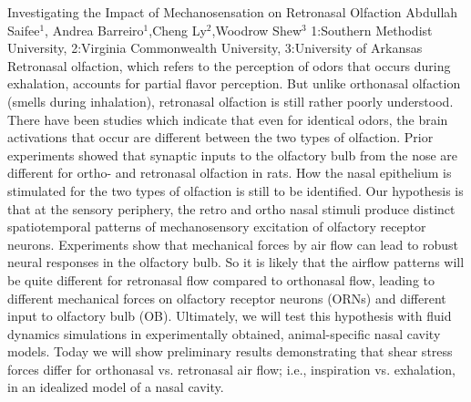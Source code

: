 \vspace{1.5ex}
\abs
{Investigating the Impact of Mechanosensation on Retronasal Olfaction}
{Abdullah Saifee$^1$, Andrea Barreiro$^1$,Cheng Ly$^2$,Woodrow Shew$^3$}
{1:Southern Methodist University, 2:Virginia Commonwealth University, 3:University of Arkansas}
{Retronasal olfaction, which refers to the perception of odors that occurs during exhalation, accounts for partial flavor perception. But unlike orthonasal olfaction (smells during inhalation), retronasal olfaction is still rather poorly understood. There have been studies which indicate that even for identical odors, the brain activations that occur are different between the two types of olfaction. Prior experiments showed that synaptic inputs to the olfactory bulb from the nose are different for ortho- and retronasal olfaction in rats. How the nasal epithelium is stimulated for the two types of olfaction is still to be identified. Our hypothesis is that at the sensory periphery, the retro and ortho nasal stimuli produce distinct spatiotemporal patterns of mechanosensory excitation of olfactory receptor neurons. Experiments show that mechanical forces by air flow can lead to robust neural responses in the olfactory bulb. So it is likely that the airflow patterns will be quite different for retronasal flow compared to orthonasal flow, leading to different mechanical forces on olfactory receptor neurons (ORNs) and different input to olfactory bulb (OB). Ultimately, we will test this hypothesis with fluid dynamics simulations in experimentally obtained, animal-specific nasal cavity models.  Today we will show preliminary results demonstrating that shear stress forces differ for orthonasal vs. retronasal air flow; i.e., inspiration vs. exhalation, in an idealized model of a nasal cavity.}




